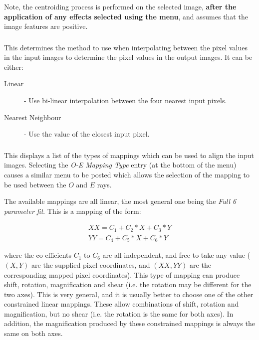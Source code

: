 Note, the centroiding process is performed on the selected image, {\bf
after the application of any effects selected using the  menu}, and assumes that the image features
are positive.

\subsubsection {}
This determines the method to use when interpolating between the pixel
values in the input images to determine the pixel values in the output
images. It can be either:

\begin{description}
\item [Linear] - Use bi-linear interpolation between the four nearest
input pixels.
\item [Nearest Neighbour] - Use the value of the closest input pixel.
\end{description}

\subsubsection {} This displays a 
list of the types of mappings which can be used to align the input
images. Selecting the {\em O-E Mapping Type} entry (at the bottom of the
menu) causes a similar menu to be posted which allows the selection of
the mapping to be used between the $O$ and $E$ rays.

The available mappings are all linear, the most general one being the
{\em Full 6 parameter fit}. This is a mapping of the form:

\begin{eqnarray*}
XX = C_{1} + C_{2}*X + C_{3}*Y \\
YY = C_{4} + C_{5}*X + C_{6}*Y 
\end{eqnarray*}

where the co-efficients $C_{1}$ to $C_{6}$ are all independent, and free
to take any value ($(X,Y)$ are the supplied pixel coordinates, and
$(XX,YY)$ are the corresponding mapped pixel coordinates). This type of
mapping can produce shift, rotation, magnification and shear (i.e. the 
rotation may be different for the two axes). This is very general,
and it is usually better to choose one of the other constrained linear 
mappings. These allow
combinations of shift, rotation and magnification, but no shear (i.e. the
rotation is the same for both axes). In addition, the magnification
produced by these constrained mappings is always the same on both axes.

